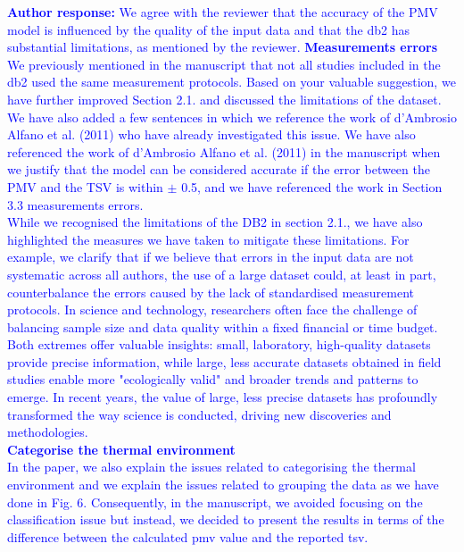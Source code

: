 \documentclass[a4paper, 10pt]{letter}
\newcommand{\response}[1]{\textcolor{blue}{\textbf{Author response:} #1}}
\begin{document}
\begin{letter}
\begin{enumerate}
            \response{
                We agree with the reviewer that the accuracy of the PMV model is influenced by the quality of the input data and that the \ac{db2} has substantial limitations, as mentioned by the reviewer. 
                \textbf{Measurements errors}\\
                We previously mentioned in the manuscript that not all studies included in the \ac{db2} used the same measurement protocols. 
                Based on your valuable suggestion, we have further improved Section 2.1. and discussed the limitations of the dataset.
                We have also added a few sentences in which we reference the work of d’Ambrosio Alfano et al. (2011) who have already investigated this issue.
                We have also referenced the work of d’Ambrosio Alfano et al. (2011) in the manuscript when we justify that the model can be considered accurate if the error between the PMV and the TSV is within $\pm$ 0.5, and we have referenced the work in Section 3.3 measurements errors.\\
                While we recognised the limitations of the DB2 in section 2.1., we have also highlighted the measures we have taken to mitigate these limitations.
                For example, we clarify that if we believe that errors in the input data are not systematic across all authors, the use of a large dataset could, at least in part, counterbalance the errors caused by the lack of standardised measurement protocols.
                In science and technology, researchers often face the challenge of balancing sample size and data quality within a fixed financial or time budget. 
                Both extremes offer valuable insights: small, laboratory, high-quality datasets provide precise information, while large, less accurate datasets obtained in field studies enable more "ecologically valid" and broader trends and patterns to emerge. 
                In recent years, the value of large, less precise datasets has profoundly transformed the way science is conducted, driving new discoveries and methodologies.\\
                \textbf{Categorise the thermal environment}\\
                In the paper, we also explain the issues related to categorising the thermal environment and we explain the issues related to grouping the data as we have done in Fig. 6.
                Consequently, in the manuscript, we avoided focusing on the classification issue but instead, we decided to present the results in terms of the difference between the calculated \ac{pmv} value and the reported \ac{tsv}.
            }


\end{enumerate}
\end{letter}
\end{document}
